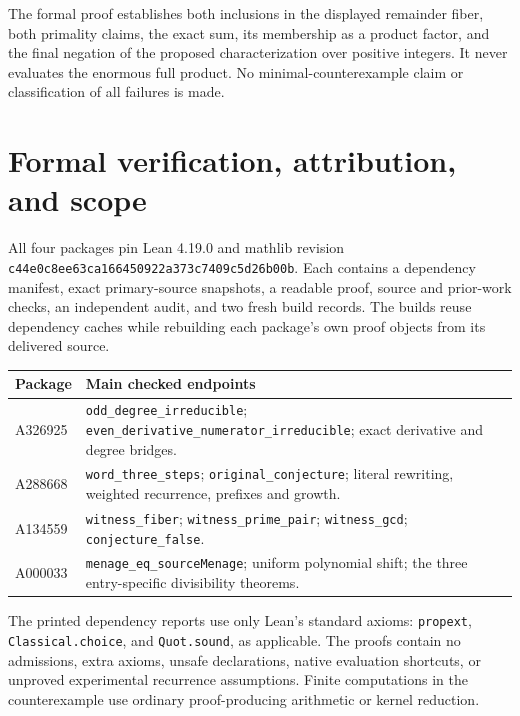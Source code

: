 \documentclass[11pt]{article}
\begin{document}
The formal proof establishes both inclusions in the displayed remainder
fiber, both primality claims, the exact sum, its membership as a product
factor, and the final negation of the proposed characterization over
positive integers. It never evaluates the enormous full product.
No minimal-counterexample claim or classification of all failures is
made.



\section{Formal verification, attribution, and scope}

All four packages pin Lean 4.19.0 and mathlib revision
\texttt{c44e0c8ee63ca166450922a373c7409c5d26b00b}. Each contains a
dependency manifest, exact primary-source snapshots, a readable proof,
source and prior-work checks, an independent audit, and two fresh build
records. The builds reuse dependency caches while rebuilding each
package's own proof objects from its delivered source.

\begin{center}
\begin{tabular}{@{}l>{\raggedright\arraybackslash}p{4.7in}@{}}
\toprule
Package & Main checked endpoints\\
\midrule
A326925 & \texttt{odd\_degree\_irreducible};
\texttt{even\_derivative\_numerator\_irreducible}; exact derivative and degree bridges.\\
A288668 & \texttt{word\_three\_steps}; \texttt{original\_conjecture}; literal rewriting, weighted recurrence, prefixes and growth.\\
A134559 & \texttt{witness\_fiber}; \texttt{witness\_prime\_pair}; \texttt{witness\_gcd}; \texttt{conjecture\_false}.\\
A000033 & \texttt{menage\_eq\_sourceMenage}; uniform polynomial shift; the three entry-specific divisibility theorems.\\
\bottomrule
\end{tabular}
\end{center}

The printed dependency reports use only Lean's standard axioms:
\texttt{propext}, \texttt{Classical.choice}, and \texttt{Quot.sound}, as
applicable. The proofs contain no admissions, extra axioms, unsafe
declarations, native evaluation shortcuts, or unproved experimental
recurrence assumptions. Finite computations in the counterexample use
ordinary proof-producing arithmetic or kernel reduction.
\end{document}
